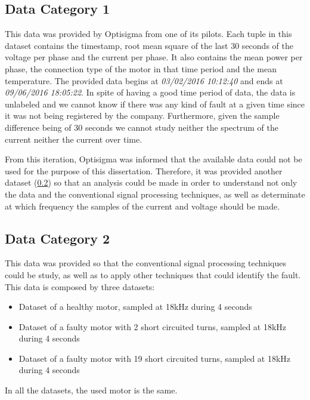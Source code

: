\subsection{Data Category 1}
\label{subsec:data_category_1}

This data was provided by Optisigma from one of its pilots. Each tuple in this dataset contains the timestamp, root mean square of the last 30 seconds of the voltage per phase and the  current per phase. It also contains the mean power per phase, the connection type of the motor in that time period and the mean temperature.
The provided data begins at \emph{03/02/2016  10:12:40} and ends at \emph{09/06/2016  18:05:22}.
In spite of having a good time period of data, the data is unlabeled and we cannot know if there was any kind of fault at a given time since it was not being registered by the company.
Furthermore, given the sample difference being of 30 seconds we cannot study neither the spectrum of the current neither the current over time.

From this iteration, Optisigma was informed that the available data could not be used for the purpose of this dissertation.
Therefore, it was provided another dataset (\ref{subsec:data_category_2}) so that an analysis could be made in order to understand not only the data and the conventional signal processing techniques, as well as determinate at which frequency the samples of the current and voltage should be made.

\subsection{Data Category 2}
\label{subsec:data_category_2}

This data was provided so that the conventional signal processing techniques could be study, as well as to apply other techniques that could identify the fault. This data is composed by three datasets:

\begin{itemize}
  \item 
  Dataset of a healthy motor, sampled at 18kHz during 4 seconds
  \item 
  Dataset of a faulty motor with 2 short circuited turns, sampled at 18kHz during 4 seconds
  \item 
  Dataset of a faulty motor with 19 short circuited turns, sampled at 18kHz during 4 seconds
\end{itemize}

In all the datasets, the used motor is the same.

